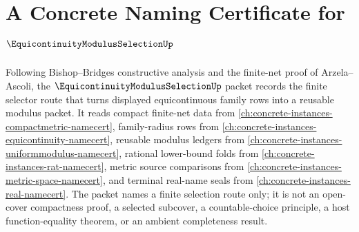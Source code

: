 \chapter{A Concrete Naming Certificate for $\EquicontinuityModulusSelectionUp$}
\label{ch:concrete-instances-equicontinuity-modulus-selection-namecert}

Following Bishop--Bridges constructive analysis and the finite-net proof of Arzela--Ascoli, the $\EquicontinuityModulusSelectionUp$ packet records the finite selector route that turns displayed equicontinuous family rows into a reusable modulus packet. It reads compact finite-net data from \autoref{ch:concrete-instances-compactmetric-namecert}, family-radius rows from \autoref{ch:concrete-instances-equicontinuity-namecert}, reusable modulus ledgers from \autoref{ch:concrete-instances-uniformmodulus-namecert}, rational lower-bound folds from \autoref{ch:concrete-instances-rat-namecert}, metric source comparisons from \autoref{ch:concrete-instances-metric-space-namecert}, and terminal real-name seals from \autoref{ch:concrete-instances-real-namecert}. The packet names a finite selection route only; it is not an open-cover compactness proof, a selected subcover, a countable-choice principle, a host function-equality theorem, or an ambient completeness result.

